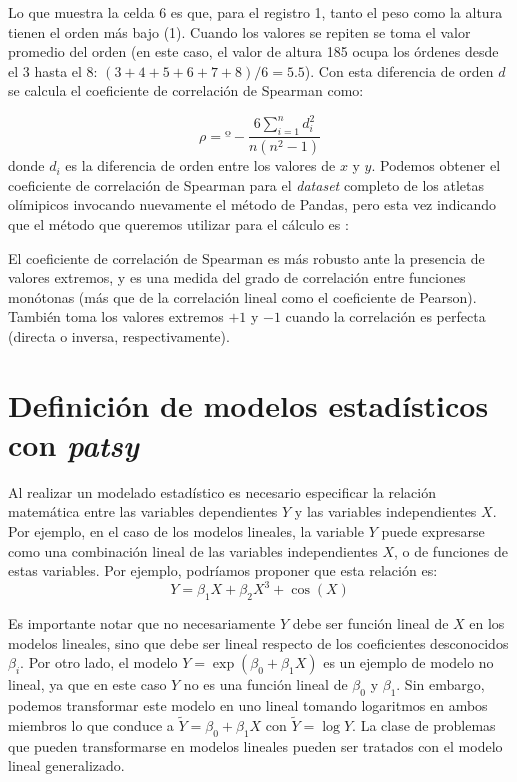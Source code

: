 
Lo que muestra la celda 6 es que, para el registro 1, tanto el peso como la altura tienen el orden más bajo (1). Cuando los valores se repiten se toma el valor promedio del orden (en este caso, el valor de altura 185 ocupa los órdenes desde el 3 hasta el 8:  $(3+4+5+6+7+8)/6=5.5$). Con esta diferencia de orden $d$ se calcula el coeficiente de correlación de Spearman como:

\[ \rho = º - \frac{6 \sum\limits_{i=1}^n d_i^2}{n(n^2-1)}  \]
donde $d_i$ es la diferencia de orden entre los valores de $x$ y $y$. Podemos obtener el coeficiente de correlación de Spearman para el \textit{dataset} completo de los atletas olímipicos invocando nuevamente el método  de Pandas, pero esta vez indicando que el método que queremos utilizar para el cálculo es :


El coeficiente de correlación de Spearman es más robusto ante la presencia de valores extremos, y es una medida del grado de correlación entre funciones monótonas (más que de la correlación lineal como el coeficiente de Pearson). También toma los valores extremos $+1$ y $-1$ cuando la correlación es perfecta (directa o inversa, respectivamente).


\section{Definición de modelos estadísticos con \textit{patsy}}

Al realizar un modelado estadístico es necesario especificar la relación matemática entre las variables dependientes $Y$ y las variables independientes $X$. Por ejemplo, en el caso de los modelos lineales, la variable $Y$ puede expresarse como una combinación lineal de las variables independientes $X$, o de funciones de estas variables. Por ejemplo, podríamos proponer que esta relación es:
\[ Y = \beta_1 X + \beta_2 X^3 + \cos(X)  \]

Es importante notar que no necesariamente $Y$ debe ser función lineal de $X$ en los modelos lineales, sino que debe ser lineal respecto de los coeficientes desconocidos $\beta_i$. Por otro lado, el modelo $Y = \exp(\beta_0 + \beta_1 X)$ es un ejemplo de modelo no lineal, ya que en este caso $Y$ no es una función lineal de $\beta_0$ y $\beta_1$. Sin embargo, podemos transformar este modelo en uno lineal tomando logaritmos en ambos miembros lo que conduce a $\widetilde{Y} = \beta_0 + \beta_1 X$ con $\widetilde{Y} = \log{Y}$. La clase de problemas que pueden transformarse en modelos lineales pueden ser tratados con el modelo lineal generalizado.

